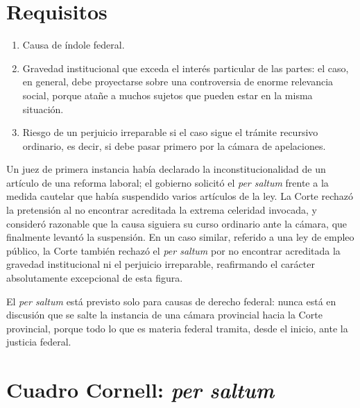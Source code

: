 \documentclass[12pt,oneside]{book}
\begin{document}
\section{Requisitos}

\begin{enumerate}[leftmargin=1.6em]
  \item Causa de índole federal.
  \item Gravedad institucional que exceda el interés particular de las partes:
  el caso, en general, debe proyectarse sobre una controversia de enorme
  relevancia social, porque atañe a muchos sujetos que pueden estar en la misma
  situación.
  \item Riesgo de un perjuicio irreparable si el caso sigue el trámite recursivo
  ordinario, es decir, si debe pasar primero por la cámara de apelaciones.
\end{enumerate}

\begin{exbox}
Un juez de primera instancia había declarado la inconstitucionalidad de un
artículo de una reforma laboral; el gobierno solicitó el \textit{per saltum}
frente a la medida cautelar que había suspendido varios artículos de la ley. La
Corte rechazó la pretensión al no encontrar acreditada la extrema celeridad
invocada, y consideró razonable que la causa siguiera su curso ordinario ante la
cámara, que finalmente levantó la suspensión. En un caso similar, referido a una
ley de empleo público, la Corte también rechazó el \textit{per saltum} por no
encontrar acreditada la gravedad institucional ni el perjuicio irreparable,
reafirmando el carácter absolutamente excepcional de esta figura.
\end{exbox}

\begin{impbox}
El \textit{per saltum} está previsto solo para causas de derecho federal: nunca
está en discusión que se salte la instancia de una cámara provincial hacia la
Corte provincial, porque todo lo que es materia federal tramita, desde el inicio,
ante la justicia federal.
\end{impbox}

\section{Cuadro Cornell: \textit{per saltum}}
\end{document}
